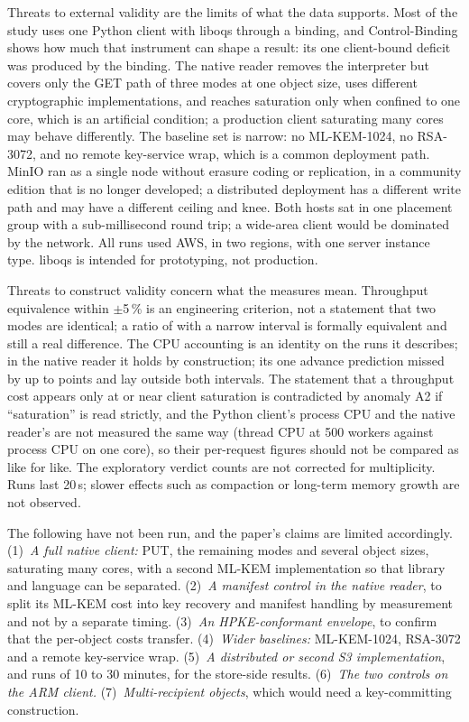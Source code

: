 \documentclass[review,12pt]{elsarticle}
\newcommand{\lab}[1]{\textsf{#1}}
\begin{document}
Threats to external validity are the limits of what the data supports. Most of the study uses one
Python client with liboqs through a binding, and \lab{Control-Binding} shows how much that instrument can
shape a result: its one client-bound deficit was produced by the binding. The native reader
removes the interpreter but covers only the GET path of three modes at one object size, uses
different cryptographic implementations, and reaches saturation only when confined to one core,
which is an artificial condition; a production client saturating many cores may behave
differently. The baseline set is narrow: no ML-KEM-1024, no RSA-3072, and no remote
key-service wrap, which is a common deployment path. MinIO ran as a single node without erasure
coding or replication, in a community edition that is no longer developed; a distributed
deployment has a different write path and may have a different ceiling and knee. Both hosts sat
in one placement group with a sub-millisecond round trip; a wide-area client would be dominated
by the network. All runs used AWS, in two regions, with one server instance type. liboqs is
intended for prototyping, not production.

Threats to construct validity concern what the measures mean. Throughput equivalence within $\pm$5\,\% is an engineering criterion, not a
statement that two modes are identical; a ratio of \RevHotRatio{} with a narrow interval is
formally equivalent and still a real difference. The CPU accounting is an identity on the runs
it describes; in the native reader it holds by construction; its one advance prediction missed
by up to \AudPredictionErrorL{} points and lay outside both intervals. The statement that a
throughput cost appears only at or near client saturation is contradicted by anomaly A2 if
``saturation'' is read strictly, and the Python client's process CPU and the native reader's
are not measured the same way (thread CPU at 500 workers against process CPU on one core), so
their per-request figures should not be compared as like for like. The exploratory verdict counts are not corrected for
multiplicity. Runs last 20\,s; slower effects such as compaction or long-term memory growth are
not observed.

The following have not been run, and the paper's claims are limited accordingly.
(1)~\emph{A full native client:} PUT, the remaining modes and several object sizes, saturating
many cores, with a second ML-KEM implementation so that library and language can be separated.
(2)~\emph{A manifest control in the native reader}, to split its ML-KEM cost into key recovery
and manifest handling by measurement and not by a separate timing.
(3)~\emph{An HPKE-conformant envelope}, to confirm that the per-object costs transfer.
(4)~\emph{Wider baselines:} ML-KEM-1024, RSA-3072 and a remote key-service wrap.
(5)~\emph{A distributed or second S3 implementation}, and runs of 10 to 30 minutes, for the
store-side results.
(6)~\emph{The two controls on the ARM client.}
(7)~\emph{Multi-recipient objects}, which would need a key-committing construction.
\end{document}

